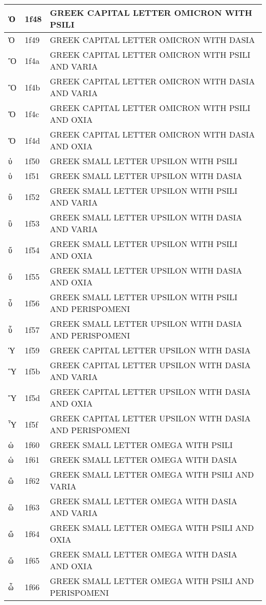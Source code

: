 \documentclass[12pt,letterpaper,openany]{book}
\begin{document}
\begin{center}
\begin{supertabular}{|m{0.25in}|m{0.5in}|m{4in}|}
Ὀ & 1f48 & GREEK CAPITAL LETTER OMICRON WITH PSILI\\\hline
Ὁ & 1f49 & GREEK CAPITAL LETTER OMICRON WITH DASIA\\\hline
Ὂ & 1f4a & GREEK CAPITAL LETTER OMICRON WITH PSILI AND VARIA\\\hline
Ὃ & 1f4b & GREEK CAPITAL LETTER OMICRON WITH DASIA AND VARIA\\\hline
Ὄ & 1f4c & GREEK CAPITAL LETTER OMICRON WITH PSILI AND OXIA\\\hline
Ὅ & 1f4d & GREEK CAPITAL LETTER OMICRON WITH DASIA AND OXIA\\\hline
ὐ & 1f50 & GREEK SMALL LETTER UPSILON WITH PSILI\\\hline
ὑ & 1f51 & GREEK SMALL LETTER UPSILON WITH DASIA\\\hline
ὒ & 1f52 & GREEK SMALL LETTER UPSILON WITH PSILI AND VARIA\\\hline
ὓ & 1f53 & GREEK SMALL LETTER UPSILON WITH DASIA AND VARIA\\\hline
ὔ & 1f54 & GREEK SMALL LETTER UPSILON WITH PSILI AND OXIA\\\hline
ὕ & 1f55 & GREEK SMALL LETTER UPSILON WITH DASIA AND OXIA\\\hline
ὖ & 1f56 & GREEK SMALL LETTER UPSILON WITH PSILI AND PERISPOMENI\\\hline
ὗ & 1f57 & GREEK SMALL LETTER UPSILON WITH DASIA AND PERISPOMENI\\\hline
Ὑ & 1f59 & GREEK CAPITAL LETTER UPSILON WITH DASIA\\\hline
Ὓ & 1f5b & GREEK CAPITAL LETTER UPSILON WITH DASIA AND VARIA\\\hline
Ὕ & 1f5d & GREEK CAPITAL LETTER UPSILON WITH DASIA AND OXIA\\\hline
Ὗ & 1f5f & GREEK CAPITAL LETTER UPSILON WITH DASIA AND PERISPOMENI\\\hline
ὠ & 1f60 & GREEK SMALL LETTER OMEGA WITH PSILI\\\hline
ὡ & 1f61 & GREEK SMALL LETTER OMEGA WITH DASIA\\\hline
ὢ & 1f62 & GREEK SMALL LETTER OMEGA WITH PSILI AND VARIA\\\hline
ὣ & 1f63 & GREEK SMALL LETTER OMEGA WITH DASIA AND VARIA\\\hline
ὤ & 1f64 & GREEK SMALL LETTER OMEGA WITH PSILI AND OXIA\\\hline
ὥ & 1f65 & GREEK SMALL LETTER OMEGA WITH DASIA AND OXIA\\\hline
ὦ & 1f66 & GREEK SMALL LETTER OMEGA WITH PSILI AND PERISPOMENI\\\hline

\end{supertabular}
\end{center}
\end{document}
